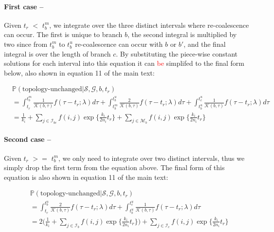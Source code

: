\documentclass[11pt]{article}
\begin{document}
\paragraph{First case --} Given $t_r$ $<$ $t_b^m$, we integrate over the three
distinct intervals where re-coalescence can occur. The first is unique to branch $b$, 
the second integral is multiplied by two since from $t_b^m$ to $t_b^u$ re-coalescence
can occur with $b$ or $b'$, and the final integral is over the length of branch $c$.
By substituting the piece-wise constant solutions for each interval into this equation
it can \textcolor{red}{be} simplifed to the final form below, also shown in equation 11 of the main text:

\begin{equation}
\begin{aligned}
	&\mathbb{P}(\text{topology-unchanged} | \mathcal{S}, \mathcal{G}, b, t_r) \\
	&= \int_{t_r}^{t_b^m}
	\frac{1}{\mathcal{K}(b,\tau)} f(\tau - t_r; \lambda) d\tau + 
	\int_{t_b^m}^{t_b^u}
	\frac{2}{\mathcal{K}(b,\tau)} f(\tau - t_r; \lambda) d\tau + 
	\int_{t_b^u}^{t_c^u} \frac{1}{\mathcal{K}(b,\tau)} f(\tau - t_r; \lambda) d\tau \\
	&= \frac{1}{k_i} + 
	\sum_{j \in \mathcal{I}_{bc}}	f(i,j) \exp \bigg\{	\frac{k_i}{2n_i} t_r \bigg\} + 
	\sum_{j \in \mathcal{M}_b}    f(i,j) \exp \bigg\{ \frac{k_i}{2n_i} t_r \bigg\}
\end{aligned}
\end{equation}

\paragraph{Second case --} Given $t_r$ $>=$ $t_b^m$, we only need to integrate over
two distinct intervals, thus we simply drop the first term from the equation above.
The final form of this equation is also shown in equation 11 of the main text:

\begin{equation}
\begin{aligned}
	&\mathbb{P}(\text{topology-unchanged} | \mathcal{S}, \mathcal{G}, b, t_r) \\
	&= \int_{t_r}^{t_b^u} \frac{2}{\mathcal{K}(b,\tau)} f(\tau - t_r; \lambda) d\tau + 
	 \int_{t_b^u}^{t_c^u} \frac{1}{\mathcal{K}(b, \tau)} f(\tau - t_r; \lambda) d\tau \\
	&= 2 \bigg(
		\frac{1}{k_i} + 
		\sum_{j \in \mathcal{I}_b} f(i,j) \exp \bigg\{ \frac{k_i}{2n_i} t_r \bigg\}
	\bigg) + 
	\sum_{j \in \mathcal{I}_c} f(i,j) \exp \bigg\{ \frac{k_i}{2n_i} t_r \bigg\}
\end{aligned}
\end{equation}
\end{document}
